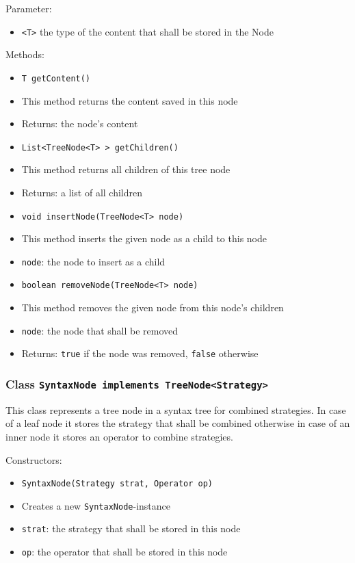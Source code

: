\documentclass[parskip=full,11pt]{scrartcl}
\begin{document}
Parameter:
\begin{itemize}\itemsep -10pt
	\item \texttt{<T>} the type of the content that shall be stored in the Node
\end{itemize}

Methods:
\begin{itemize}\itemsep -10pt
	\item \texttt{T getContent()}
	\item[] This method returns the content saved in this node
	\item[] Returns: the node's content

	\item \texttt{List<TreeNode<T>\,> getChildren()}
	\item[] This method returns all children of this tree node
	\item[] Returns: a list of all children

	\item \texttt{void insertNode(TreeNode<T> node)}
	\item[] This method inserts the given node as a child to this node
	\item[] \texttt{node}: the node to insert as a child

	\item \texttt{boolean removeNode(TreeNode<T> node)}
	\item[] This method removes the given node from this node's children
	\item[] \texttt{node}: the node that shall be removed
	\item[] Returns: \texttt{true} if the node was removed, \texttt{false} otherwise
\end{itemize}

\subsubsection{Class \texttt{SyntaxNode implements TreeNode<Strategy>}}

This class represents a tree node in a syntax tree for combined strategies. In case of a leaf node it stores the strategy that shall be combined otherwise in case of an inner node it stores an operator to combine strategies.

Constructors:
\begin{itemize} \itemsep -10pt
	\item \texttt{SyntaxNode(Strategy strat, Operator op)}
	\item[] Creates a new \texttt{SyntaxNode}-instance
	\item[] \texttt{strat}: the strategy that shall be stored in this node
	\item[] \texttt{op}: the operator that shall be stored in this node
\end{itemize}
\end{document}
